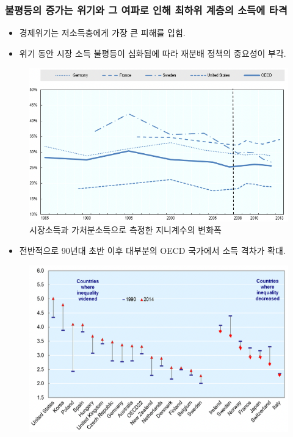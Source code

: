 \documentclass[aspectratio=169,xcolor=dvipsnames,handout]{beamer}
\begin{document}
\subsubsection{ 불평등의 증가는 위기와 그 여파로 인해 최하위 계층의 소득에 타격}

\begin{frame}{}
    \begin{itemize}
        \item 경제위기는 저소득층에게 가장 큰 피해를 입힘.
        \item 위기 동안 시장 소득 불평등이 심화됨에 따라 재분배 정책의 중요성이 부각.
    \end{itemize}
    \begin{figure}
        \centering
        \includegraphics[scale=.3]{pic/tpin2.3.png}
        \caption{시장소득과 가처분소득으로 측정한 지니계수의 변화폭}
    \end{figure}
\end{frame}

\begin{frame}{}
    \begin{itemize}
        \item 전반적으로 90년대 초반 이후 대부분의 OECD 국가에서 소득 격차가 확대. 
    \end{itemize}
    \begin{figure}
        \centering
        \includegraphics[scale=.3]{pic/tpin2.4.png}
        \caption{}
    \end{figure}
\end{frame}
\end{document}
